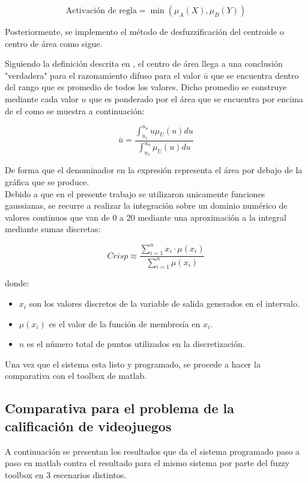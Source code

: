 \documentclass[11pt, letterpaper]{article}
\begin{document}
\[
\text{Activación de regla}  = \min( \mu_A(X), \mu_B(Y) )
\]

\newpage

Posteriormente, se implemento el método de desfuzzificación del centroide o centro de área como sigue.

Siguiendo la definición descrita en \cite{Cisneros2004}, el centro de área llega a una conclusión "verdadera" para el razonamiento difuso para el valor $\bar{u}$ que se encuentra dentro del rango que es promedio de todos los valores. Dicho promedio se construye mediante cada valor $u$ que es ponderado por el área que se encuentra por encima de el como se muestra a continuación:


$$\bar{u} = \frac{\int_{u_1}^{u_n}u\mu_{U}(u)du}{\int_{u_1}^{u_n}\mu_{U}(u)du}$$

De forma que el denominador en la expresión representa el área por debajo de la gráfica que se produce.\\

Debido a que en el presente trabajo se utilizaron unicamente funciones gaussianas, se recurre a realizar la integración sobre un dominio numérico de valores continuos que van de 0 a 20 mediante una aproximación a la integral mediante sumas discretas:

$$Crisp \approx \frac{\sum_{i=1}^{n} x_i \cdot \mu(x_i)}{\sum_{i=1}^{n} \mu(x_i)}$$

donde:

\begin{itemize}
	\item \( x_i \) son los valores discretos de la variable de salida generados en el intervalo.
	\item \( \mu(x_i) \) es el valor de la función de membresía en \( x_i \).
	\item \( n \) es el número total de puntos utilizados en la discretización.
\end{itemize}


Una vez que el sistema esta listo y programado, se procede a hacer la comparativa con el toolbox de matlab.

\newpage

\subsection{Comparativa para el problema de la calificación de videojuegos}


A continuación se presentan los resultados que da el sistema programado paso a paso en matlab contra el resultado para el mismo sistema por parte del fuzzy toolbox en 3 escenarios distintos.
\end{document}
